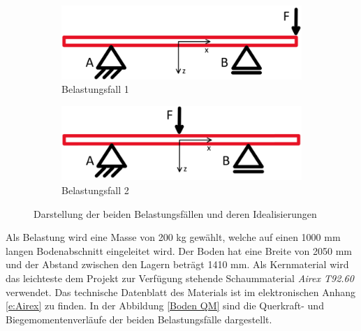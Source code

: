 \begin{figure}[!ht]
  \centering
    \begin{subfigure}{.5\textwidth}
      \centering
      \includegraphics[width=.8\linewidth]{04_figures/Boden Fall1.png}
      \caption{Belastungsfall 1}
      \label{Belastungsfall 1}
    \end{subfigure}%
    \begin{subfigure}{.5\textwidth}
      \centering
      \includegraphics[width=.8\linewidth]{04_figures/Boden Fall2.png}
      \caption{Belastungsfall 2}
      \label{Belastungsfall 2}
    \end{subfigure}%
  \caption{Darstellung der beiden Belastungsfällen und deren Idealisierungen}
\label{Boden Idealisierung}
\end{figure}

Als Belastung wird eine Masse von 200 kg gewählt, welche auf einen 1000 mm langen Bodenabschnitt eingeleitet wird. Der Boden hat eine Breite von 2050 mm und der Abstand zwischen den Lagern beträgt 1410 mm. Als Kernmaterial wird das leichteste dem Projekt zur Verfügung stehende Schaummaterial \emph{Airex T92.60} verwendet. Das technische Datenblatt des Materials ist im elektronischen Anhang \ref{e:Airex} zu finden. In der Abbildung \ref{Boden QM} sind die Querkraft- und Biegemomentenverläufe der beiden Belastungsfälle dargestellt.

